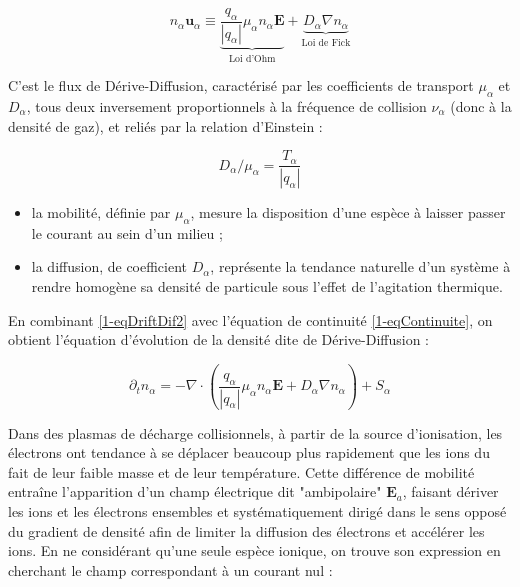 \begin{refsection}
\begin{equation}
\label{1-eqDriftDif2}
n_\alpha\mathbf u_\alpha\equiv\underbrace{\frac{q_\alpha}{|q_\alpha|}\mu_\alpha n_\alpha\mathbf E}_\text{Loi d'Ohm}+\underbrace{D_\alpha{\nabla n_\alpha}}_\text{Loi
de Fick}
\end{equation}

 C'est le flux de Dérive-Diffusion, caractérisé par les coefficients de
transport $\mu_\alpha$ et
$D_\alpha$, tous deux inversement proportionnels à la fréquence de collision
$\nu_\alpha$ (donc à la densité de gaz), et reliés par la relation d'Einstein :

\begin{equation}
\label{1-EinsteinRelation}
D_\alpha/\mu_\alpha=\frac{T_\alpha}{|q_\alpha|}
\end{equation}

\begin{itemize}
  \item la mobilité, définie par $\mu_\alpha$,
  mesure la disposition d'une espèce à laisser passer le courant au sein d'un
  milieu ; 
  \item la diffusion, de coefficient $D_\alpha$,
  représente la tendance naturelle d'un système à rendre homogène sa densité de particule sous l'effet
  de l'agitation thermique.
\end{itemize}

En combinant \eqref{1-eqDriftDif2} avec l'équation de continuité
\eqref{1-eqContinuite}, on obtient l'équation d'évolution de la densité
dite de Dérive-Diffusion :
 
\begin{equation}
\label{1-eqDriftDifContinuite}
\partial_t
n_\alpha=-\nabla\cdot({\frac{q_\alpha}{|q_\alpha|}\mu_\alpha n_\alpha\mathbf E}
+{D_\alpha{\nabla n_\alpha}})+S_\alpha
\end{equation}

Dans des plasmas de décharge collisionnels, à partir de la source d'ionisation,
les électrons ont tendance à se déplacer beaucoup plus rapidement que les ions
du fait de leur faible masse et de leur température. Cette différence de
mobilité entraîne l'apparition d'un champ électrique dit "ambipolaire"
$\mathbf E_a$, faisant dériver les ions et les électrons ensembles et
systématiquement dirigé dans le sens opposé du gradient de densité afin de
limiter la diffusion des électrons et accélérer les ions. En ne considérant
qu'une seule espèce ionique, on trouve son expression en cherchant le champ
correspondant à un courant nul :
 

\end{refsection}
